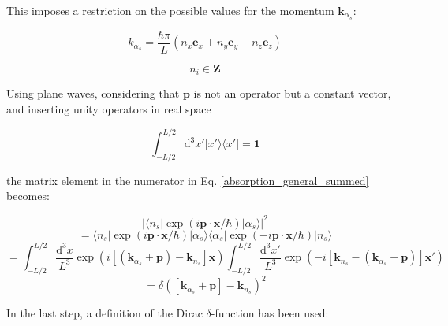 \documentclass{article}
\begin{document}
This imposes a restriction on the possible values for the momentum $\mathbf{k}_{\alpha_s}$:

\begin{equation}
	\label{k_quantization}
	k_{\alpha_s} = \frac{\hbar \pi}{L} \left( n_x \mathbf{e}_x + n_y \mathbf{e}_y + n_z \mathbf{e}_z \right)
\end{equation}

\begin{equation*}
	n_i \in \mathbf{Z}
\end{equation*}

Using plane waves, considering that $\mathbf{p}$ is not an operator but a constant vector, and inserting unity operators in real space

\begin{equation}
	\int_{-L/2}^{L/2} \mathrm{d}^3 x' \left| x' \rangle \langle x' \right| = \mathbf{1}
\end{equation}

the matrix element in the numerator in Eq. \ref{absorption_general_summed} becomes:

\begin{equation}
	\label{plane_wave_delta}
	\left| \langle n_s | \exp{\left( i \mathbf{p} \cdot \mathbf{x} / \hbar \right)} | \alpha_s \rangle \right|^2 
\end{equation}
\begin{equation*}
	= \langle n_s | \exp{\left( i \mathbf{p} \cdot \mathbf{x} / \hbar \right)} | \alpha_s \rangle \langle \alpha_s | \exp{\left( -i \mathbf{p} \cdot \mathbf{x} / \hbar \right)} | n_s \rangle
\end{equation*}
\begin{equation*}
	= \int_{-L/2}^{L/2} \frac{\mathrm{d}^3 x}{L^3} \exp{ \left( i \left[ \left( \mathbf{k}_{\alpha_s} + \mathbf{p} \right) - \mathbf{k}_{n_s} \right] \mathbf{x} \right) } \int_{-L/2}^{L/2}\frac{\mathrm{d}^3 x'}{L^3} \exp{ \left( - i \left[ \mathbf{k}_{n_s} - \left( \mathbf{k}_{\alpha_s} + \mathbf{p} \right) \right] \mathbf{x}' \right) }
\end{equation*}
\begin{equation*}
	= \delta \left( \left[ \mathbf{k}_{\alpha_s} + \mathbf{p} \right] - \mathbf{k}_{n_s} \right)^2
\end{equation*}

In the last step, a definition of the Dirac $\delta$-function has been used:
\end{document}
